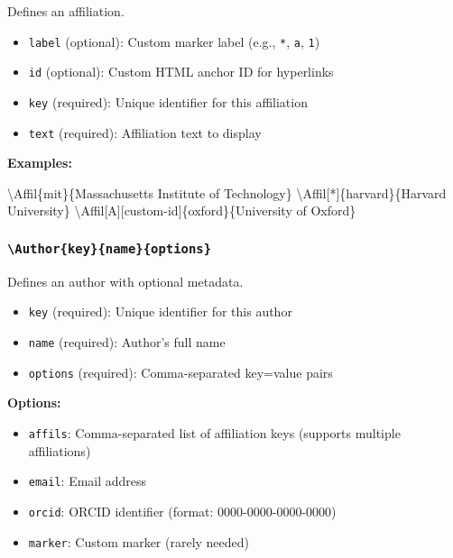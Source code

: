 \documentclass[
]{article}
\newenvironment{Shaded}{}{}
\newcommand{\FunctionTok}[1]{\textcolor[rgb]{0.02,0.16,0.49}{#1}}
\newcommand{\NormalTok}[1]{#1}
\providecommand{\tightlist}{%
  \setlength{\itemsep}{0pt}\setlength{\parskip}{0pt}}
\begin{document}
Defines an affiliation.

\begin{itemize}
\tightlist
\item
  \texttt{label} (optional): Custom marker label (e.g., \texttt{*},
  \texttt{a}, \texttt{1})
\item
  \texttt{id} (optional): Custom HTML anchor ID for hyperlinks
\item
  \texttt{key} (required): Unique identifier for this affiliation
\item
  \texttt{text} (required): Affiliation text to display
\end{itemize}

\textbf{Examples:}

\begin{Shaded}
\begin{Highlighting}[]
\FunctionTok{\textbackslash{}Affil}\NormalTok{\{mit\}\{Massachusetts Institute of Technology\}}
\FunctionTok{\textbackslash{}Affil}\NormalTok{[*]\{harvard\}\{Harvard University\}}
\FunctionTok{\textbackslash{}Affil}\NormalTok{[A][custom{-}id]\{oxford\}\{University of Oxford\}}
\end{Highlighting}
\end{Shaded}

\hypertarget{authorkeynameoptions}{%
\subsubsection{\texorpdfstring{\texttt{\textbackslash{}Author\{key\}\{name\}\{options\}}}{\textbackslash Author\{key\}\{name\}\{options\}}}\label{authorkeynameoptions}}

Defines an author with optional metadata.

\begin{itemize}
\tightlist
\item
  \texttt{key} (required): Unique identifier for this author
\item
  \texttt{name} (required): Author's full name
\item
  \texttt{options} (required): Comma-separated key=value pairs
\end{itemize}

\textbf{Options:}

\begin{itemize}
\tightlist
\item
  \texttt{affils}: Comma-separated list of affiliation keys (supports
  multiple affiliations)
\item
  \texttt{email}: Email address
\item
  \texttt{orcid}: ORCID identifier (format: 0000-0000-0000-0000)
\item
  \texttt{marker}: Custom marker (rarely needed)
\end{itemize}
\end{document}
